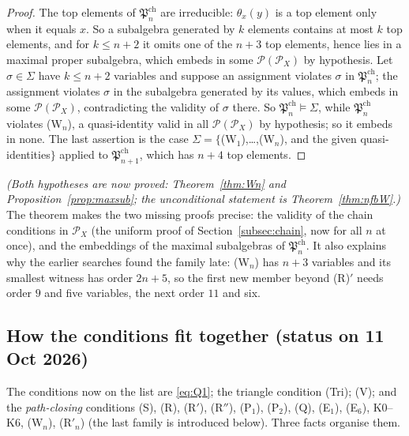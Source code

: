 \documentclass[11pt]{amsart}
\theoremstyle{definition}
\renewcommand{\P}{\mathcal{P}}
\begin{document}
\begin{proof}
The top elements of $\mathfrak P^{\mathrm{ch}}_n$ are irreducible: $\theta_x(y)$ is a top element only when it equals $x$. So a subalgebra generated by $k$ elements contains at most $k$ top elements, and for $k\le n+2$ it omits one of the $n+3$ top elements, hence lies in a maximal proper subalgebra, which embeds in some $\P(\P_X)$ by hypothesis. Let $\sigma\in\Sigma$ have $k\le n+2$ variables and suppose an assignment violates $\sigma$ in $\mathfrak P^{\mathrm{ch}}_n$; the assignment violates $\sigma$ in the subalgebra generated by its values, which embeds in some $\P(\P_X)$, contradicting the validity of $\sigma$ there. So $\mathfrak P^{\mathrm{ch}}_n\models\Sigma$, while $\mathfrak P^{\mathrm{ch}}_n$ violates \textup{(W$_n$)}, a quasi-identity valid in all $\P(\P_X)$ by hypothesis; so it embeds in none. The last assertion is the case $\Sigma=\{$(W$_1$),\dots,(W$_n$), and the given quasi-identities$\}$ applied to $\mathfrak P^{\mathrm{ch}}_{n+1}$, which has $n+4$ top elements.
\end{proof}

\emph{(Both hypotheses are now proved: Theorem~\ref{thm:Wn} and Proposition~\ref{prop:maxsub}; the unconditional statement is Theorem~\ref{thm:nfbW}.)} The theorem makes the two missing proofs precise: the validity of the chain conditions in $\P_X$ (the uniform proof of Section~\ref{subsec:chain}, now for all $n$ at once), and the embeddings of the maximal subalgebras of $\mathfrak P^{\mathrm{ch}}_n$. It also explains why the earlier searches found the family late: (W$_n$) has $n+3$ variables and its smallest witness has order $2n+5$, so the first new member beyond (R)$'$ needs order $9$ and five variables, the next order $11$ and six.

\subsection{How the conditions fit together (status on 11 Oct 2026)}\label{subsec:picture}

The conditions now on the list are \eqref{eq:Q1}; the triangle condition (Tri); (V); and the \emph{path-closing} conditions (S), (R), (R$'$), (R$''$), (P$_1$), (P$_2$), (Q), (E$_1$), (E$_6$), K0--K6, (W$_n$), (R$'_n$) (the last family is introduced below). Three facts organise them.
\end{document}
